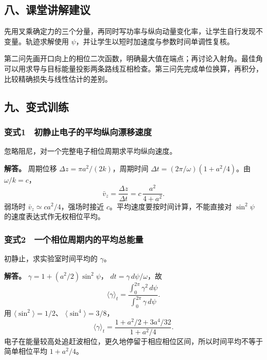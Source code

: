 \documentclass[12pt,a4paper,fontset=fandol]{ctexart}
\begin{document}
\subsection{八、课堂讲解建议}\label{ux516bux8bfeux5802ux8bb2ux89e3ux5efaux8bae-3}

先用叉乘确定力的三个分量，再同时写功率与纵向动量变化率，让学生自行发现不变量。轨迹求解使用
\(\psi\)，并让学生以短时加速度与参数时间单调性复核。

第二问先画开口向上的相位二次函数，明确最大值在端点；再讨论入射角。最佳角可以用求导与目标能量投影两条路线互相检查。第三问先完成单位换算，再积分，比较精确损失与线性估计的差别。

\subsection{九、变式训练}\label{ux4e5dux53d8ux5f0fux8badux7ec3-3}

\subsubsection{变式1　初静止电子的平均纵向漂移速度}\label{ux53d8ux5f0f1-ux521dux9759ux6b62ux7535ux5b50ux7684ux5e73ux5747ux7eb5ux5411ux6f02ux79fbux901fux5ea6}

忽略阻尼，对一个完整电子相位周期求平均纵向速度。

\textbf{解答。} 周期位移 \(\Delta z=\pi a^2/(2k)\)，周期时间
\(\Delta t=(2\pi/\omega)(1+a^2/4)\)。由 \(\omega/k=c\)， \[
\boxed{\bar v_z=\frac{\Delta z}{\Delta t}
=c\,\frac{a^2}{4+a^2}.}
\] 弱场时 \(\bar v_z\simeq ca^2/4\)，强场时接近
\(c\)。平均速度要按时间计算，不能直接对 \(\sin^2\psi\)
的速度表达式作无权相位平均。

\subsubsection{变式2　一个相位周期内的平均总能量}\label{ux53d8ux5f0f2-ux4e00ux4e2aux76f8ux4f4dux5468ux671fux5185ux7684ux5e73ux5747ux603bux80fdux91cf}

初静止，求实验室时间平均的 \(\gamma\)。

\textbf{解答。} \(\gamma=1+(a^2/2)\sin^2\psi\)，
\(dt=\gamma\,d\psi/\omega\)，故 \[
\langle\gamma\rangle_t=
\frac{\int_0^{2\pi}\gamma^2\,d\psi}
{\int_0^{2\pi}\gamma\,d\psi}.
\] 用 \(\langle\sin^2\rangle=1/2\)、 \(\langle\sin^4\rangle=3/8\)， \[
\boxed{\langle\gamma\rangle_t
=\frac{1+a^2/2+3a^4/32}{1+a^2/4}.}
\]
电子在能量较高处追赶波相位，更久地停留于相应相位区间，所以时间平均不等于简单相位平均
\(1+a^2/4\)。
\end{document}
